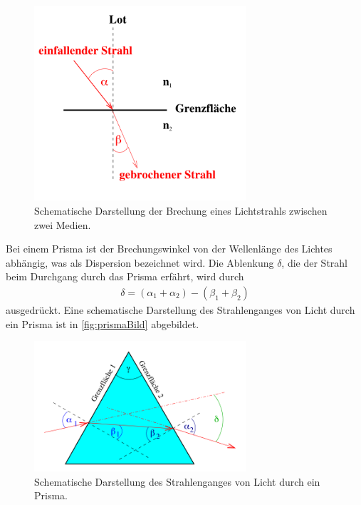 \begin{figure}[H]
    \centering
    \includegraphics[width=0.7\textwidth]{data/brechung.png}
    \caption{Schematische Darstellung der Brechung eines Lichtstrahls zwischen zwei Medien\cite{Anleitung400}.}
    \label{fig:brechungBild}
\end{figure}

\noindent
Bei einem Prisma ist der Brechungswinkel von der Wellenlänge des Lichtes abhängig, was als Dispersion bezeichnet wird. Die Ablenkung $\delta$, die der Strahl beim Durchgang durch das Prisma erfährt,
wird durch
\begin{align}
    \delta = (\alpha_1+\alpha_2) - (\beta_1 + \beta_2)
    \label{eqn:prismaWinkel}
\end{align}
ausgedrückt. Eine schematische Darstellung des Strahlenganges von Licht durch ein Prisma ist in \autoref{fig:prismaBild} abgebildet.

\begin{figure}[H]
    \centering
    \includegraphics[width=0.7\textwidth]{data/prisma.png}
    \caption{Schematische Darstellung des Strahlenganges von Licht durch ein Prisma\cite{Anleitung400}.}
    \label{fig:prismaBild}
\end{figure}

